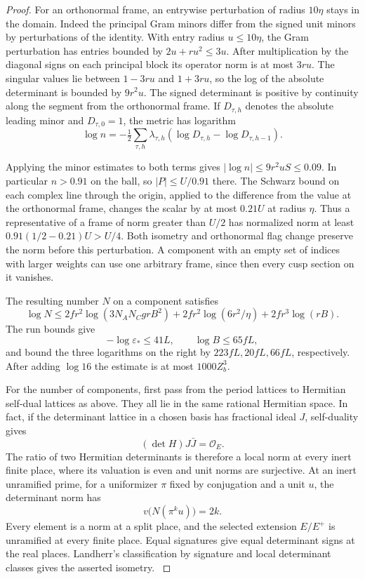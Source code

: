 \begin{proof}
For an orthonormal frame, an entrywise perturbation of radius
\(10\eta\) stays in the domain. Indeed the principal
Gram minors differ from the signed unit minors by perturbations
of the identity. With entry radius \(u\le10\eta\), the Gram
perturbation has entries bounded by \(2u+ru^2\le3u\).
After multiplication by the diagonal signs on each principal
block its operator norm is at most \(3ru\). The singular
values lie between \(1-3ru\) and \(1+3ru\), so the log
of the absolute determinant is bounded by \(9r^2u\). The signed determinant is positive by continuity along the
segment from the orthonormal frame. If \(D_{\tau,h}\) denotes
the absolute leading minor and \(D_{\tau,0}=1\), the metric
has logarithm
\[
 \log n=-\tfrac12\sum_{\tau,h}\lambda_{\tau,h}
             (\log D_{\tau,h}-\log D_{\tau,h-1}).
\]

Applying the minor estimates to both terms gives
\(|\log n|\le9r^2uS\le0.09\). In particular \(n>0.91\)
on the ball, so \(|P|\le U/0.91\) there.
The Schwarz bound on each complex line through the origin,
applied to the difference from the value at the orthonormal
frame, changes the scalar by at most \(0.21U\) at radius
\(\eta\). Thus a representative of a frame of norm greater
than \(U/2\) has normalized norm at least
\(0.91(1/2-0.21)U>U/4\).
Both isometry and orthonormal flag change preserve the norm
before this perturbation. A component with an empty set of indices with larger weights can use one arbitrary frame, since then every cusp
section on it vanishes. \label{cor:slice-evaluation-net-3}

The resulting number \(N\) on a component satisfies
\[
 \log N\le
   2fr^2\log(3N_AN_Cgr B^2)
   +2fr^2\log(6r^2/\eta)+2fr^3\log(rB).
\]
The run bounds give \[
 -\log\varepsilon_*\le41L,\qquad \log B\le65fL,
\] and bound the three logarithms
on the right by \(223fL,20fL,66fL\), respectively.
After adding \(\log16\) the estimate is at most \(1000Z_b^3\).

For the number of components, first pass from the period
lattices to Hermitian self-dual lattices as above. They all
lie in the same rational Hermitian space. In fact, if the
determinant lattice in a chosen basis has fractional ideal
\(J\), self-duality gives 
\[
  (\det H)J\bar J=\mathcal O_E.
\]
The ratio of two Hermitian determinants is therefore a local
norm at every inert finite place, where its valuation is even
and unit norms are surjective.
At an inert unramified prime, for a uniformizer \(\pi\) fixed by conjugation and a unit \(u\), the determinant norm has
\[
  v\big(N(\pi^k u)\big)=2k .
\]
 Every element is a norm at a
split place, and the selected extension \(E/E^+\) is unramified
at every finite place. Equal signatures give equal determinant
signs at the real places. Landherr's classification by signature
and local determinant classes gives the asserted isometry.
\cite{landherr}\label{cor:slice-evaluation-net-4}


\end{proof}
